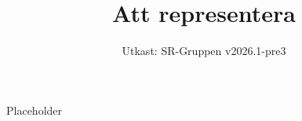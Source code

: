 \documentclass[a4paper]{dtek}
\title{Att representera}
\date{Utkast: SR-Gruppen v2026.1-pre3}
\begin{document}
Placeholder
\end{document}
